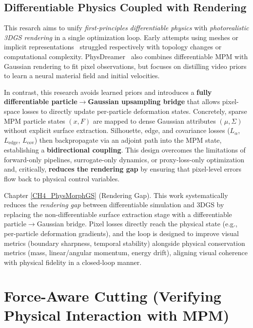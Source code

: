 \subsection{Differentiable Physics Coupled with Rendering}
    This resarch aims to unify \emph{first-principles differentiable physics} with \emph{photorealistic 3DGS rendering} in a single optimization loop. Early attempts using meshes or implicit representations~\citep{Yifan_2019,laine2020modular,wu2025pbr} struggled respectively with topology changes or computational complexity. PhysDreamer~\citep{zhang2024physdreamerphysicsbasedinteraction3d} also combines differentiable MPM with Gaussian rendering to fit pixel observations, but focuses on distilling video priors to learn a neural material field and initial velocities.
    
    In contrast, this research avoids learned priors and introduces a \textbf{fully differentiable particle$\rightarrow$Gaussian upsampling bridge} that allows pixel-space losses to directly update per-particle deformation states. Concretely, sparse MPM particle states $(x, F)$ are mapped to dense Gaussian attributes $(\mu, \Sigma)$ without explicit surface extraction. Silhouette, edge, and covariance losses ($L_\alpha$, $L_{\text{edge}}$, $L_{\text{cov}}$) then backpropagate via an adjoint path into the MPM state, establishing a \textbf{bidirectional coupling}. This design overcomes the limitations of forward-only pipelines, surrogate-only dynamics, or proxy-loss-only optimization and, critically, \textbf{reduces the rendering gap} by ensuring that pixel-level errors flow back to physical control variables.
    
{Chapter \ref{CH4_PhysMorphGS} (Rendering Gap).}
    This work systematically reduces the \emph{rendering gap} between differentiable simulation and 3DGS by replacing the non-differentiable surface extraction stage with a differentiable particle$\rightarrow$Gaussian bridge. Pixel losses directly reach the physical state (e.g., per-particle deformation gradients), and the loop is designed to improve visual metrics (boundary sharpness, temporal stability) alongside physical conservation metrics (mass, linear/angular momentum, energy drift), aligning visual coherence with physical fidelity in a closed-loop manner.

\section{Force-Aware Cutting (Verifying Physical Interaction with MPM)}
